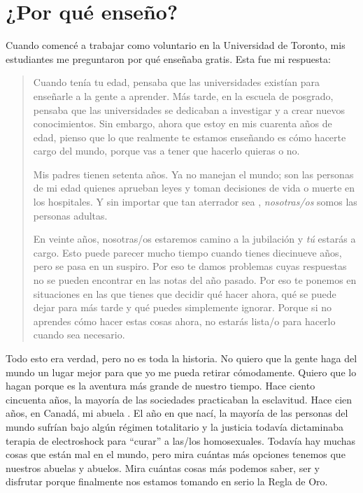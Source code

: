 \chapter{¿Por qué enseño?}\label{s:finale}

Cuando comencé a trabajar como voluntario en la Universidad de Toronto,
mis estudiantes me preguntaron por qué enseñaba gratis.
Esta fue mi respuesta:

\begin{quote}

Cuando tenía tu edad,
pensaba que las universidades existían para enseñarle a la gente a aprender.
Más tarde,
en la escuela de posgrado,
pensaba que las universidades se dedicaban a investigar y a crear nuevos conocimientos.
Sin embargo, ahora que estoy en mis cuarenta años de edad,
pienso que lo que realmente te estamos enseñando es
cómo hacerte cargo del mundo,
porque vas a tener que hacerlo quieras o no.

Mis padres tienen setenta años.
Ya no manejan el mundo;
son las personas de mi edad quienes aprueban leyes
y toman decisiones de vida o muerte en los hospitales.
Y sin importar que tan aterrador sea ,
\emph{nosotras/os} somos las personas adultas.

En veinte años,
nosotras/os estaremos camino a la jubilación y \emph{tú} estarás a cargo.
Esto puede parecer mucho tiempo cuando tienes diecinueve años,
pero se pasa en un suspiro.
Por eso te damos problemas cuyas respuestas no se pueden encontrar en las notas del año pasado.
Por eso te ponemos en situaciones en las que 
tienes que decidir qué hacer ahora, 
qué se puede dejar para más tarde
y qué puedes simplemente ignorar.
Porque si no aprendes cómo hacer estas cosas ahora,
no estarás lista/o para hacerlo cuando sea necesario.

\end{quote}

Todo esto era verdad,
pero no es toda la historia.
No quiero que la gente haga del mundo un lugar mejor para que yo me pueda retirar cómodamente.
Quiero que lo hagan porque es la aventura más grande de nuestro tiempo.
Hace ciento cincuenta años,
la mayoría de las sociedades practicaban la esclavitud.
Hace cien años, en Canadá,
mi abuela .
El año en que nací,
la mayoría de las personas del mundo sufrían bajo algún régimen totalitario
y la justicia todavía dictaminaba terapia de electroshock para ``curar'' a las/los homosexuales.
Todavía hay muchas cosas que están mal en el mundo,
pero mira cuántas más opciones tenemos que nuestros abuelas y abuelos. 
Mira cuántas cosas más podemos saber, ser y disfrutar
porque finalmente nos estamos tomando en serio la Regla de Oro.

